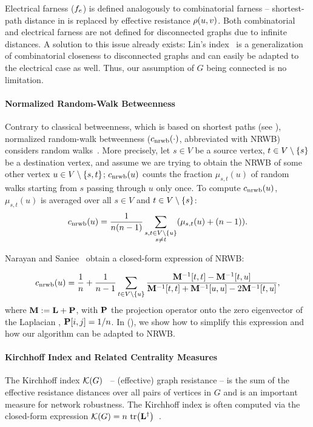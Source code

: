 Electrical farness ($f_e$) is defined analogously to combinatorial
farness -- shortest-path distance in  is replaced by
effective resistance $\rho(u, v)$. Both combinatorial and electrical farness
are not defined for disconnected graphs due to infinite distances. A solution
to this issue already exists: Lin's index~\cite{lin1976foundations} is a
generalization of combinatorial closeness to disconnected graphs and can easily
be adapted to the electrical case as well. Thus, our assumption of $G$ being
connected is no limitation.

\paragraph{Normalized Random-Walk Betweenness}
Contrary to classical betweenness, which is based on shortest paths (see
), normalized random-walk betweenness ($c_{\text{nrwb}}(\cdot)$, abbreviated with NRWB)
considers random walks~\cite{DBLP:conf/complexnetworks/NarayanS18}. More
precisely, let $s \in V$ be a source vertex, $t \in V\setminus\set{s}$ be a destination vertex,
and assume we are trying to obtain the NRWB of some other vertex $u \in V\setminus\set{s, t}$;
$c_{\text{nrwb}}(u)$ counts the fraction $\mu_{s, t}(u)$ of random walks starting from
$s$ passing through $u$ only once.
To compute $c_{\text{nrwb}}(u)$, $\mu_{s, t}(u)$ is averaged over all $s\in V$ and
$t \in V\setminus \set{s}$:
%
\[
\nrwb(u) = \frac{1}{n(n - 1)}
\sum_{\substack{s,t \in V \setminus \set{u}\\s\neq t}}\roundb{\mu_{s, t}(u) + (n - 1)}.
\]

Narayan and Saniee~\cite{DBLP:conf/complexnetworks/NarayanS18} obtain a
closed-form expression of NRWB:

\begin{equation}
\label{eq:def:nrwb}
\nrwb(u) = \frac{1}{n} + \frac{1}{n - 1}\sum_{t \in V \setminus \set{u}}
\frac{\mat{M}^{-1}[t, t] - \mat{M}^{-1}[t, u]}{\mat{M}^{-1}[t, t] + \mat{M}^{-1}[u, u] - 2\mat{M}^{-1}[t, u]},
\end{equation}
%
where $\mathbf{M} := \mathbf{L} + \mathbf{P}$, with $\mathbf{P}$ the projection operator onto
the zero eigenvector of the Laplacian \Lapl, \ie $\mathbf{P}[i, j] = 1/n$. In
 (), we show
how to simplify this expression and how our algorithm can be adapted to NRWB.

\paragraph{Kirchhoff Index and Related Centrality Measures}
The Kirchhoff index $\mathcal{K}(G)$~\cite{ellens2011effective,klein1993resistance}
-- \aka (effective) graph resistance -- is the sum of the effective resistance
distances over all pairs of vertices in $G$ and is an important measure for
network robustness. The Kirchhoff index is often computed via the closed-form
expression $\kidx(G) = n\ \tr{\Linv}$~\cite{klein1993resistance}.

